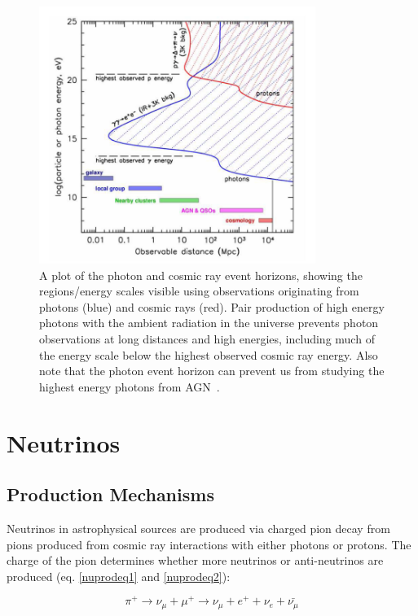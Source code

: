 \begin{figure}[h]
\centering
\includegraphics[width=0.8\textwidth]{figs/photevthorizon.png}
\caption{A plot of the photon and cosmic ray event horizons, showing the regions/energy scales visible using observations originating from photons (blue) and cosmic rays (red). Pair production of high energy photons with the ambient radiation in the universe prevents photon observations at long distances and high energies, including much of the energy scale below the highest observed cosmic ray energy. Also note that the photon event horizon can prevent us from studying the highest energy photons from AGN~\cite{chen2009origin}. }
\label{fig:photeh}
\end{figure}

\section{Neutrinos}

\subsection{Production Mechanisms}
Neutrinos in astrophysical sources are produced via charged pion decay from pions produced from cosmic ray interactions with either photons or protons. The charge of the pion determines whether more neutrinos or anti-neutrinos are produced (eq. \ref{nuprodeq1} and \ref{nuprodeq2}):

\begin{equation}
    \pi^+ \rightarrow \nu_{\mu} + \mu^+ \rightarrow \nu_{\mu} + e^+ + \nu_{e}+\bar{\nu_{\mu}}
\label{nuprodeq1}
\end{equation}

